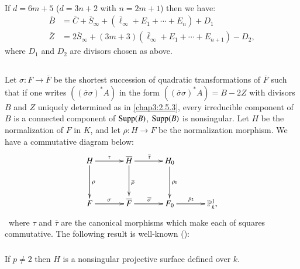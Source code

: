 \paragraph{}\label{chap3:2.5.3.6}
If $d=6m+5$ (\iec $d=3n+2$ with $n=2m+1$) then we have:
\begin{align*}
\overline{B} &=
\overline{C}+\overline{S}_{\infty}+(\overline{\ell}_{\infty}+E_{1}+\cdots+E_{n})+D_{1}\\
\overline{Z} &= 2\overline{S}_{\infty}+(3m+3)(\overline{\ell}_{\infty}+E_{1}+\cdots+E_{n+1})-D_{2},
\end{align*}
where $D_{1}$ and $D_{2}$ are divisors chosen as above.

\subsection{}\label{chap3:2.6}
Let $\sigma:F\to \overline{F}$ be the shortest succession of quadratic
transformations of $\overline{F}$ such that if one writes
$((\overline{\sigma}\sigma)^{\ast}A)$ in the form
$((\overline{\sigma}\sigma)^{\ast}A)=B-2Z$ with divisors $B$ and $Z$
uniquely determined as in \ref{chap3:2.5.3}, every irreducible component of
$B$ is a connected component of $\operatorname{Supp}(B)$, \iec $\operatorname{Supp}(B)$ is
nonsingular. Let $H$ be the normalization of $F$ in $K$, and let
$\rho:H\to F$ be the normalization morphism. We have a commutative
diagram below: 
\[
\xymatrix@=1.2cm{
H\ar[d]^{\rho}\ar[r]^{\tau} &
\overline{H}\ar[d]^{\overline{\rho}}\ar[r]^{\overline{\tau}} &
H_{0}\ar[d]^{\rho_{0}}  & \\
F\ar[r]^{\sigma} & \overline{F}\ar[r]^{\overline{\sigma}} &
F_{0}\ar[r]^{p_{2}} & \mathbb{P}^{1}_{k},
}
\]\pageoriginale\ 
where $\tau$ and $\overline{\tau}$ are the canonical morphisms which
make each of squares commutative. The following result is well-known
(\cf \cite{4}):

\subsubsection{}\label{chap3:2.6.1}
\begin{lemma*}
  If $p\neq 2$ then $H$ is a nonsingular projective surface defined over $k$.
\end{lemma*}

